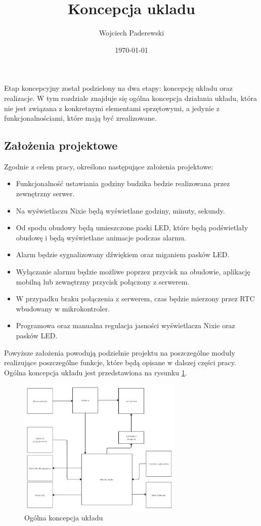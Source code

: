\documentclass[../main.tex]{subfiles}
\author{Wojciech Paderewski}
\date{\today}
\title{Koncepcja ukladu}
\begin{document}
 Etap koncepcyjny został podzielony na dwa etapy: koncepcję układu oraz realizacje. W tym rozdziale znajduje się ogólna koncepcja 
 działania układu, która nie jest związana z konkretnymi elementami sprzętowymi, a jedynie z funkcjonalnościami, które mają być zrealizowane.
 \subsection{Założenia projektowe}
Zgodnie z celem pracy, określono następujące założenia projektowe:
\begin{itemize}
    \item Funkcjonalność ustawiania godziny budzika bedzie realizowana przez zewnętrzny serwer.
    \item Na wyświetlaczu Nixie będą wyświetlane godziny, minuty, sekundy.
    \item Od spodu obudowy będą umieszczone paski LED, które będą podświetlały obudowę i będą wyświetlane animacje podczas alarmu.
    \item Alarm będzie sygnalizowany dźwiękiem oraz miganiem pasków LED.
    \item Wyłączanie alarmu będzie możliwe poprzez przycisk na obudowie, aplikację mobilną lub zewnętrzny przycisk połączony z serwerem.
    \item W przypadku braku połączenia z serwerem, czas będzie mierzony przez RTC wbudowany w mikrokontroler.
    \item Programowa oraz manualna regulacja jasności wyświetlacza Nixie oraz pasków LED.
\end{itemize}
Powyższe założenia powodują podzielnie projektu na poszczególne moduły realizujące poszczególne funkcje, które będą opisane w dalszej części pracy.
Ogólna koncepcja układu jest przedstawiona na rysunku \ref{fig:concept}.
\begin{figure}[H]
    \centering
    \includegraphics[width=0.7\textwidth]{Nixie-concept.png}
    \caption{Ogólna koncepcja układu}
    \label{fig:concept}
\end{figure}
\end{document}
